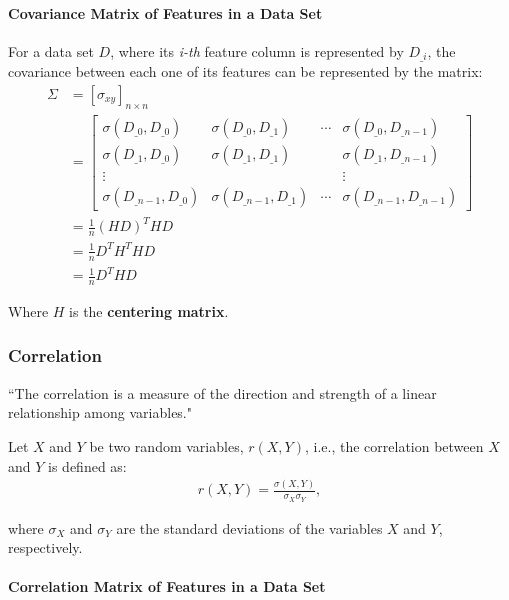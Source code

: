 \documentclass[12pt]{article}
\begin{document}
\paragraph{Covariance Matrix of Features in a Data Set}

For a data set $D$, where its {\em i-th} feature column is represented by $D_{\_i}$, the covariance between each one of its features can be represented by the matrix:
\begin{align*}
\Sigma &= [\sigma_{xy}]_{n \times n} \\
&= \begin{bmatrix}
\sigma(D_{\_0}, D_{\_0}) & \sigma(D_{\_0}, D_{\_1}) & \cdots & \sigma(D_{\_0}, D_{\_n-1}) \\
\sigma(D_{\_1}, D_{\_0}) & \sigma(D_{\_1}, D_{\_1}) & & \sigma(D_{\_1}, D_{\_n-1}) \\
\vdots &&& \vdots \\
\sigma(D_{\_n-1}, D_{\_0}) & \sigma(D_{\_n-1}, D_{\_1}) & \cdots & \sigma(D_{\_n-1}, D_{\_n-1})
\end{bmatrix} \\
&= \frac{1}{n} (HD)^T HD \\
&= \frac{1}{n} D^T H^T H D \\
 &= \frac{1}{n} D^T H D
\end{align*}

Where $H$ is the \textbf{centering matrix}.

\subsubsection{Correlation}

``The correlation is a measure of the direction and strength of a linear relationship among variables."

Let $X$ and $Y$ be two random variables, $r(X, Y)$, i.e., the correlation between $X$ and $Y$ is defined as:
\begin{align*}
	r(X, Y) = \frac{\sigma(X, Y)}{\sigma_X \sigma_Y},
\end{align*}

where $\sigma_X$ and $\sigma_Y$ are the standard deviations of the variables $X$ and $Y$, respectively.

\paragraph{Correlation Matrix of Features in a Data Set}
\end{document}
